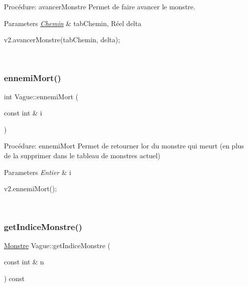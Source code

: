 Procédure\+: avancer\+Monstre Permet de faire avancer le monstre. 


\begin{DoxyParams}{Parameters}
{\em \hyperlink{classChemin}{Chemin}} & tab\+Chemin, Réel delta 
\begin{DoxyCode}
v2.avancerMonstre(tabChemin, delta);
\end{DoxyCode}
 \\
\hline
\end{DoxyParams}
\mbox{\label{classVague_ad732fb032c4b02416946736b1e25dcc8}} 
\subsubsection{\texorpdfstring{ennemi\+Mort()}{ennemiMort()}}
{\footnotesize\ttfamily int Vague\+::ennemi\+Mort (\begin{DoxyParamCaption}\item[{const int \&}]{i }\end{DoxyParamCaption})}



Procédure\+: ennemi\+Mort Permet de retourner l\textquotesingle{}or du monstre qui meurt (en plus de la supprimer dans le tableau de monstres actuel) 


\begin{DoxyParams}{Parameters}
{\em Entier} & i 
\begin{DoxyCode}
v2.ennemiMort();
\end{DoxyCode}
 \\
\hline
\end{DoxyParams}
\mbox{\label{classVague_af1356b21ff8e2eb3ed40e7c3a0419711}} 
\subsubsection{\texorpdfstring{get\+Indice\+Monstre()}{getIndiceMonstre()}}
{\footnotesize\ttfamily \hyperlink{classMonstre}{Monstre} Vague\+::get\+Indice\+Monstre (\begin{DoxyParamCaption}\item[{const int \&}]{n }\end{DoxyParamCaption}) const}



